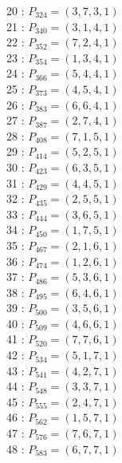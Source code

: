 \documentclass{article}
\begin{document}
{\begin{multicols}{2}
20 : $P_{324}=( 3, 7, 3, 1 )$\\
21 : $P_{340}=( 3, 1, 4, 1 )$\\
22 : $P_{352}=( 7, 2, 4, 1 )$\\
23 : $P_{354}=( 1, 3, 4, 1 )$\\
24 : $P_{366}=( 5, 4, 4, 1 )$\\
25 : $P_{373}=( 4, 5, 4, 1 )$\\
26 : $P_{383}=( 6, 6, 4, 1 )$\\
27 : $P_{387}=( 2, 7, 4, 1 )$\\
28 : $P_{408}=( 7, 1, 5, 1 )$\\
29 : $P_{414}=( 5, 2, 5, 1 )$\\
30 : $P_{423}=( 6, 3, 5, 1 )$\\
31 : $P_{429}=( 4, 4, 5, 1 )$\\
32 : $P_{435}=( 2, 5, 5, 1 )$\\
33 : $P_{444}=( 3, 6, 5, 1 )$\\
34 : $P_{450}=( 1, 7, 5, 1 )$\\
35 : $P_{467}=( 2, 1, 6, 1 )$\\
36 : $P_{474}=( 1, 2, 6, 1 )$\\
37 : $P_{486}=( 5, 3, 6, 1 )$\\
38 : $P_{495}=( 6, 4, 6, 1 )$\\
39 : $P_{500}=( 3, 5, 6, 1 )$\\
40 : $P_{509}=( 4, 6, 6, 1 )$\\
41 : $P_{520}=( 7, 7, 6, 1 )$\\
42 : $P_{534}=( 5, 1, 7, 1 )$\\
43 : $P_{541}=( 4, 2, 7, 1 )$\\
44 : $P_{548}=( 3, 3, 7, 1 )$\\
45 : $P_{555}=( 2, 4, 7, 1 )$\\
46 : $P_{562}=( 1, 5, 7, 1 )$\\
47 : $P_{576}=( 7, 6, 7, 1 )$\\
48 : $P_{583}=( 6, 7, 7, 1 )$\\
\end{multicols}
}
\end{document}
